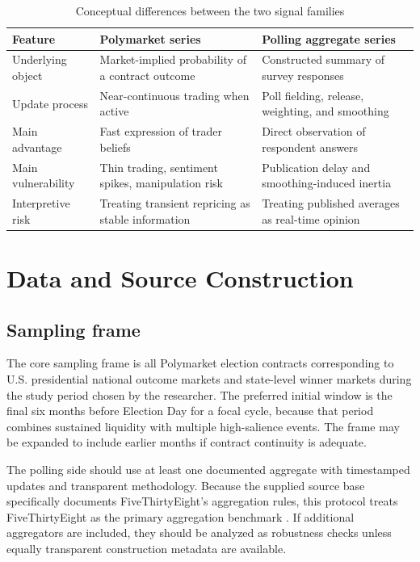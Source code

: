 \documentclass[11pt]{article}
\begin{document}
\begin{table}[t]
\centering
\caption{Conceptual differences between the two signal families}
\begin{tabular}{p{3.0cm}p{5.2cm}p{5.2cm}}
\toprule
Feature & Polymarket series & Polling aggregate series \\
\midrule
Underlying object & Market-implied probability of a contract outcome & Constructed summary of survey responses \\
Update process & Near-continuous trading when active & Poll fielding, release, weighting, and smoothing \\
Main advantage & Fast expression of trader beliefs & Direct observation of respondent answers \\
Main vulnerability & Thin trading, sentiment spikes, manipulation risk & Publication delay and smoothing-induced inertia \\
Interpretive risk & Treating transient repricing as stable information & Treating published averages as real-time opinion \\
\bottomrule
\end{tabular}
\end{table}

\section{Data and Source Construction}

\subsection{Sampling frame}
The core sampling frame is all Polymarket election contracts corresponding to U.S. presidential national outcome markets and state-level winner markets during the study period chosen by the researcher. The preferred initial window is the final six months before Election Day for a focal cycle, because that period combines sustained liquidity with multiple high-salience events. The frame may be expanded to include earlier months if contract continuity is adequate.

The polling side should use at least one documented aggregate with timestamped updates and transparent methodology. Because the supplied source base specifically documents FiveThirtyEight's aggregation rules, this protocol treats FiveThirtyEight as the primary aggregation benchmark \citep{howourpollingavera2023fivethir}. If additional aggregators are included, they should be analyzed as robustness checks unless equally transparent construction metadata are available.
\end{document}

